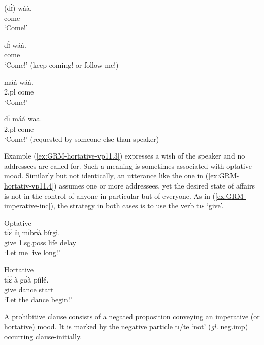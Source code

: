 \begin{multicols}{2}
 

\ea\label{ex:GRM-imper-exc-var}
\ea\label{ex:GRM-imper-exc-var-sg}
\gll (dɪ̀)  wàà.\\
 {\comp} come\\
\glt `Come!'

\ex\label{ex:GRM-imper}  
\gll dɪ̀ wáá.\\
 {\comp} come\\
 \glt `Come!' (keep coming! or follow me!)
 
\ex\label{ex:GRM-imper} 
\gll máá wáà.\\
 {\sc 2.pl} come\\
\glt `Come!'

\ex\label{ex:GRM-imper-exc-var-out}  
\gll dɪ́ máá wāā.\\
 {\comp}  {\sc 2.pl}  come\\
\glt `Come!' (requested by someone else than speaker)
\z
\z

\end{multicols}

Example (\ref{ex:GRM-hortative-vp11.3}) expresses a wish of the speaker and no
addressees are called for. Such a meaning is sometimes associated with 
 optative
mood. Similarly but not  identically,  an utterance like the one in
(\ref{ex:GRM-hortativ-vp11.4})  assumes one or more addressees, yet the desired
state of affairs is not in the control of anyone in particular but of everyone. 
 As in (\ref{ex:GRM-imperative-inc}), the  strategy in both cases is
to use the verb {\sls tɪɛ} `give'.  


\ea\label{ex:GRM-hortative}
 
\ea\label{ex:GRM-hortative-vp11.3}{\rm Optative}\\
\gll tɪ̀ɛ̀ m̩̀ mɪ̀bʊ̀à bírgì.\\
    give {\sc 1.sg.poss} life delay\\
\glt  `Let me live long!' 

\ex\label{ex:GRM-hortativ-vp11.4}{\rm Hortative}\\
\gll tɪ̀ɛ̀ à gʊ̀à píílé.\\
  give {\art} dance start\\
\glt  `Let the dance begin!'

\z 
 \z

A prohibitive clause consists of  a negated proposition conveying an imperative 
(or hortative) mood. It is marked by the negative particle {\sls tɪ}/{\sls te} 
`not'   ({\it gl.} {\sc neg.imp}) occurring clause-initially.


